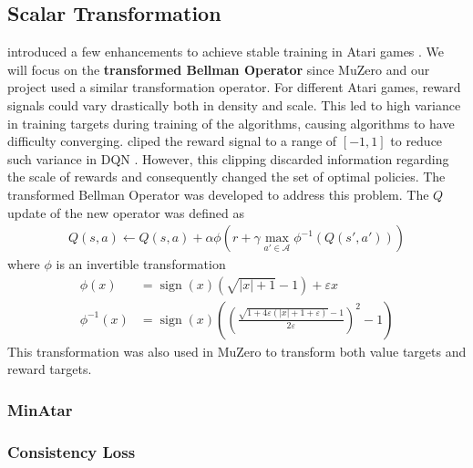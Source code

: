 \subsection{Scalar Transformation} \label{sec:scalar_transform}
\citeauthor{ObserveLookFurther_Pohlen.Piot.ea_2018} introduced a few enhancements to achieve stable training in Atari games \cite{ObserveLookFurther_Pohlen.Piot.ea_2018}.
We will focus on the \textbf{transformed Bellman Operator} since MuZero and our project used a similar transformation operator.
For different Atari games, reward signals could vary drastically both in density and scale.
This led to high variance in training targets during training of the algorithms, causing algorithms to have difficulty converging.
\citeauthor{PlayingAtariDeep_Mnih.Kavukcuoglu.ea_2013} cliped the reward signal to a range of $[-1, 1]$ to reduce such variance in DQN \cite{PlayingAtariDeep_Mnih.Kavukcuoglu.ea_2013}.
However, this clipping discarded information regarding the scale of rewards and consequently changed the set of optimal policies.
The transformed Bellman Operator was developed to address this problem.
The $Q$ update of the new operator was defined as
\begin{align*}
    Q(s, a) \leftarrow Q(s, a) + \alpha \phi \left(r +\gamma \max _{a' \in \mathcal{A}} \phi^{-1}\left(Q\left(s', a'\right)\right)\right)
\end{align*}
where $\phi$ is an invertible transformation
\begin{align*}
    \phi(x)       & = \operatorname{sign}(x)\left(\sqrt{|x|+1}-1\right)+\varepsilon x  \\
    \phi^{-1}(x)  & = \operatorname{sign}(x)\left(\left(\frac{\sqrt{1+4 \varepsilon(|x|+1+\varepsilon)}-1}{2 \varepsilon}\right)^{2}-1\right)
\end{align*}
This transformation was also used in MuZero to transform both value targets and reward targets.

\subsubsection{MinAtar}

\subsubsection{Consistency Loss}
\cite{VisualizingMuZeroModels_deVries.Voskuil.ea_2021} \cite{MasteringAtariGames_Ye.Liu.ea_2021} \cite{ObserveLookFurther_Pohlen.Piot.ea_2018}

\cite{MinAtarAtariInspiredTestbed_Young.Tian_2019}
\cite{RainbowCombiningImprovements_Hessel.Modayil.ea_2018}
